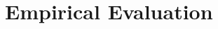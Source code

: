 \documentclass[sigconf,review]{acmart}
\begin{document}
\section{Empirical Evaluation}
\label{sec:evaluation}

\end{document}

